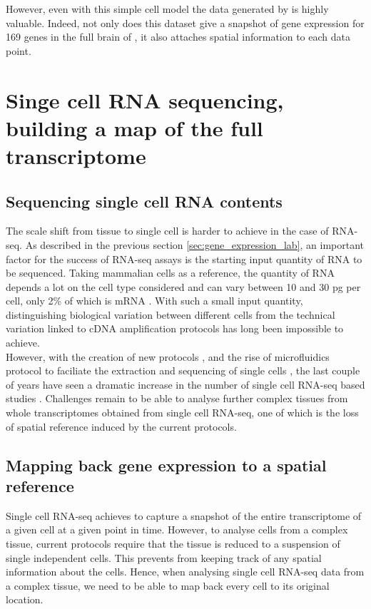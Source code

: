 	However, even with this simple cell model the data generated by \cite{Tomer10} is highly valuable. Indeed, not only does this dataset give a snapshot of gene expression for 169 genes in the full brain of \platy{}, it also attaches spatial information to each data point.\\

\section{Singe cell RNA sequencing, building a map of the full transcriptome}\label{sec:single_cell_rnaseq}
  \subsection*{Sequencing single cell RNA contents}
	The scale shift from tissue to single cell is harder to achieve in the case of RNA-seq. As described in the previous section \ref{sec:gene_expression_lab}, an important factor for the success of RNA-seq assays is the starting input quantity of RNA to be sequenced. Taking mammalian cells as a reference, the quantity of RNA depends a lot on the cell type considered and can vary between 10 and 30 pg per cell, only 2\% of which is mRNA \cite{iscove02,islam11}. With such a small input quantity, distinguishing biological variation between different cells from the technical variation linked to cDNA amplification protocols has long been impossible to achieve.\\

	However, with the creation of new protocols \cite{ramskold12,tang09}, and the rise of microfluidics protocol to faciliate the extraction and sequencing of single cells \cite{ozsolak10}, the last couple of years have seen a dramatic increase in the number of single cell RNA-seq based studies \cite{islam13,marinov13,yan13,staahlberg13,deng14}. Challenges remain to be able to analyse further complex tissues from whole transcriptomes obtained from single cell RNA-seq, one of which is the loss of spatial reference induced by the current protocols.

  \subsection*{Mapping back gene expression to a spatial reference}

	Single cell RNA-seq achieves to capture a snapshot of the entire transcriptome of a given cell at a given point in time. However, to analyse cells from a complex tissue, current protocols require that the tissue is reduced to a suspension of single independent cells. This prevents from keeping track of any spatial information about the cells. Hence, when analysing single cell RNA-seq data from a complex tissue, we need to be able to map back every cell to its original location.\\ 
	
